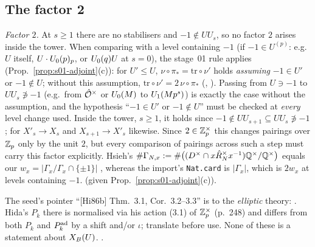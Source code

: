 \subsection{The factor 2}
\noindent\emph{Factor $2$.} At $s\ge1$ there are no stabilisers and $-1\notin UU_s$, so no factor $2$ arises inside the tower.
When comparing with a level containing $-1$ (if $-1\in U^{(p)}$: e.g.\ $U$ itself, $U\cdot U_0(p)_p$, or $U_0(q)U$ at $s=0$), the stage~01 rule
applies (Prop.~\ref{prop:s01-adjoint}(c)): for $U'\le U$, $\nu\circ\pi_*=\mathrm{tr}\circ\nu'$ holds \emph{assuming} $-1\in U'$ or
$-1\notin U$; without this assumption, $\mathrm{tr}\circ\nu'=2\,\nu\circ\pi_*$ (,
 \stformal{}). Passing from $U\ni-1$ to $UU_s\not\ni-1$ (e.g.\ from $\hat{\mathcal{O}}^\times$ or
$U_0(M)$ to $U_1(Mp^s)$) is exactly the case without the assumption, and the hypothesis ``$-1\in U'$ or $-1\notin U$'' must be
checked at \emph{every} level change used. Inside the tower, $s\ge1$, it holds since $-1\notin UU_{s+1}\subseteq UU_s\not\ni-1$; for
$X'_s\to X_s$ and $X_{s+1}\to X'_s$ likewise. Since $2\in\mathbb{Z}_p^\times$ this changes pairings over $\mathbb{Z}_p$ only by the unit $2$, but every comparison of pairings
across such a step must carry this factor explicitly. Hsieh's
$\#\Gamma_{N,x}:=\#\big((D^\times\cap x\hat R_N^\times x^{-1})\mathbb{Q}^\times/\mathbb{Q}^\times\big)$ equals our $w_x=|\Gamma_x/\Gamma_x\cap\{\pm1\}|$
, whereas the import's \texttt{Nat.card} is
$|\Gamma_x|$, which is $2w_x$ at levels containing $-1$. \stproved{} (given Prop.~\ref{prop:s01-adjoint}(c)).

\begin{remark}\label{rem:s04-hida86}
The seed's pointer ``[Hi86b] Thm.~3.1, Cor.~3.2--3.3'' is to the \emph{elliptic} theory:
. Hida's
$P_k$ there is normalised via his action (3.1) of $\mathbb{Z}_p^\times$ (p.~248) and differs from both $P_k$ and $P^{\rm ad}_k$ by a shift
and/or $\iota$; translate before use. None of these is a statement about $X_B(U)$. \stcited.
\end{remark}
